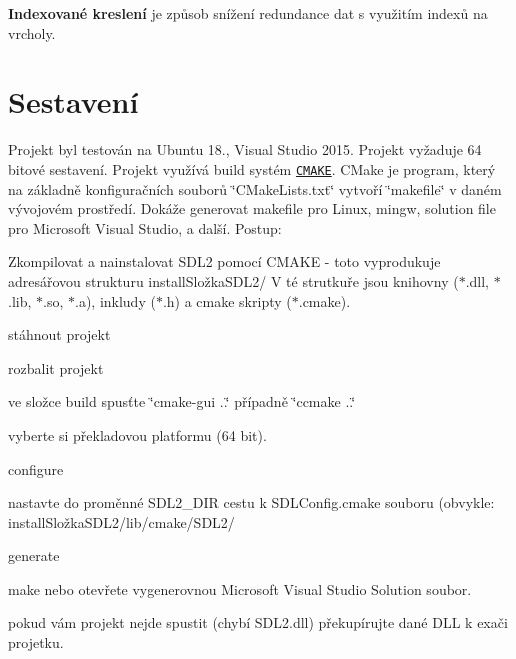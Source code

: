 {\bfseries Indexované kreslení} je způsob snížení redundance dat s využitím indexů na vrcholy.  \hypertarget{index_sestaveni}{}\section{Sestavení}\label{index_sestaveni}
Projekt byl testován na Ubuntu 18., Visual Studio 2015. Projekt vyžaduje 64 bitové sestavení. Projekt využívá build systém \href{https://cmake.org/}{\tt C\+M\+A\+KE}. C\+Make je program, který na základně konfiguračních souborů \char`\"{}\+C\+Make\+Lists.\+txt\char`\"{} vytvoří \char`\"{}makefile\char`\"{} v daném vývojovém prostředí. Dokáže generovat makefile pro Linux, mingw, solution file pro Microsoft Visual Studio, a další. Postup\+:
\begin{DoxyEnumerate}
\item Zkompilovat a nainstalovat S\+D\+L2 pomocí C\+M\+A\+KE -\/ toto vyprodukuje adresářovou strukturu install\+Složka\+S\+D\+L2/ V té strutkuře jsou knihovny ($\ast$.dll, $\ast$.lib, $\ast$.so, $\ast$.a), inkludy ($\ast$.h) a cmake skripty ($\ast$.cmake).
\item stáhnout projekt
\item rozbalit projekt
\item ve složce build spusťte \char`\"{}cmake-\/gui ..\char`\"{} případně \char`\"{}ccmake ..\char`\"{}
\item vyberte si překladovou platformu (64 bit).
\item configure
\item nastavte do proměnné S\+D\+L2\+\_\+\+D\+IR cestu k S\+D\+L\+Config.\+cmake souboru (obvykle\+: install\+Složka\+S\+D\+L2/lib/cmake/\+S\+D\+L2/
\item generate
\item make nebo otevřete vygenerovnou Microsoft Visual Studio Solution soubor.
\item pokud vám projekt nejde spustit (chybí S\+D\+L2.\+dll) překupírujte dané D\+LL k exači projetku.
\end{DoxyEnumerate}

